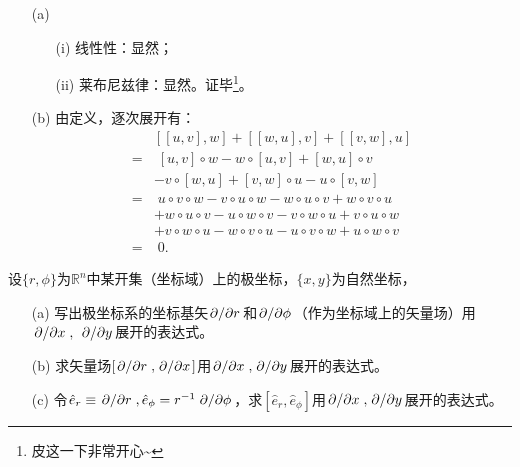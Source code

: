 \begin{xiti}
    \begin{zm}
    	\begin{enumerate}
    		\item[(a)] 
    		\begin{enumerate}
    			\item[(i)] 线性性：显然；
    			\item[(ii)] 莱布尼兹律：显然。证毕\footnote{皮这一下非常开心\textasciitilde {}}。
    		\end{enumerate}
    	    \item[(b)] 由定义，逐次展开有：
    	    \begin{equation*}
    	    \begin{split}
    	    &[[u,v],w]+[[w,u],v]+[[v,w],u]\\
    	    =&\;[u,v]\circ w-w \circ [u,v]+[w,u]\circ v\\
    	    &-v \circ [w,u]+[v,w]\circ u -u\circ [v,w]\\
    	    =&\;u\circ v\circ w-v\circ u\circ w-w\circ u\circ v+w\circ v\circ u\\
    	    &+w\circ u\circ v-u\circ w\circ v-v\circ w\circ u+v\circ u\circ w\\
    	    &+v\circ w\circ u-w\circ v\circ u-u\circ v\circ w+u\circ w\circ v\\
    	    =&\;0.
    	    \end{split}
    	    \end{equation*}
    	\end{enumerate}
    \end{zm}
    
    \item 设$\{r,\phi\}$为$\mathbb{R}^n$中某开集（坐标域）上的极坐标，$\{x,y\}$为自然坐标，
    \begin{enumerate}
    	\item[(a)] 写出极坐标系的坐标基矢$\pdv*{}{r}$和$\pdv*{}{\phi}$（作为坐标域上的矢量场）用$\pdv*{}{x},\ \pdv*{}{y}$展开的表达式。
    	\item[(b)] 求矢量场$[\pdv*{}{r},\pdv*{}{x}]$用$\pdv*{}{x},\pdv*{}{y}$展开的表达式。
    	\item[(c)] 令$\hat{e}_r\equiv\pdv*{}{r},\hat{e}_\phi=r^{-1}\pdv*{}{\phi}$，求$[\hat{e}_r,\hat{e}_\phi]$用$\pdv*{}{x},\pdv*{}{y}$展开的表达式。
    \end{enumerate}
    

\end{xiti}
